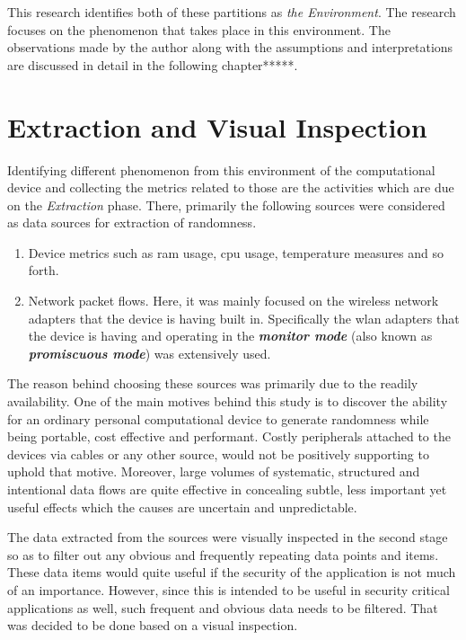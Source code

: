 This research identifies both of these partitions as \textit{the Environment}. The research focuses on the phenomenon that takes place in this environment. The observations made by the author along with the assumptions and interpretations are discussed in detail in the following chapter*****.

\section{Extraction and Visual Inspection}
Identifying different phenomenon from this environment of the computational device and collecting the metrics related to those are the activities which are due on the \textit{Extraction} phase. There, primarily the following sources were considered as data sources for extraction of randomness.

\begin{enumerate}
    \item Device metrics such as \acrfull{ram} usage, \acrfull{cpu} usage, temperature measures and so forth.
    \item Network packet flows. Here, it was mainly focused on the wireless network adapters that the device is having built in. Specifically the \acrfull{wlan} adapters that the device is having and operating in the \textbf{\textit{monitor mode}} (also known as \textbf{\textit{promiscuous mode}}) was extensively used.
\end{enumerate}

The reason behind choosing these sources was primarily due to the readily availability. One of the main motives behind this study is to discover the ability for an ordinary personal computational device to generate randomness while being portable, cost effective and performant. Costly peripherals attached to the devices via cables or any other source, would not be positively supporting to uphold that motive. Moreover, large volumes of systematic, structured and intentional data flows are quite effective in concealing subtle, less important yet useful effects which the causes are uncertain and unpredictable.

The data extracted from the sources were visually inspected in the second stage so as to filter out any obvious and frequently repeating data points and items. These data items would quite useful if the security of the application is not much of an importance. However, since this is intended to be useful in security critical applications as well, such frequent and obvious data needs to be filtered. That was decided to be done based on a visual inspection.

